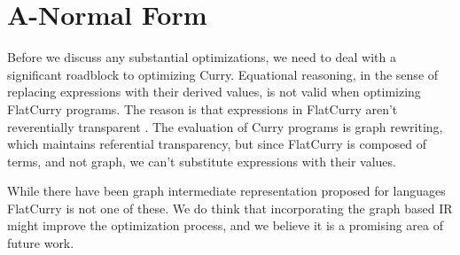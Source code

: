 \documentclass{book}
\theoremstyle{definition}
\begin{document}
\section{A-Normal Form}

Before we discuss any substantial optimizations, we need to deal with a significant
roadblock to optimizing Curry.
Equational reasoning,
in the sense of replacing expressions with their derived values,
is not valid when optimizing FlatCurry programs.
The reason is that expressions in FlatCurry aren't reverentially transparent \cite{whyFPmatters}.
The evaluation of Curry programs is graph rewriting,
which maintains referential transparency,
but since FlatCurry is composed of terms, and not graph,
we can't substitute expressions with their values.

While there have been graph intermediate representation proposed for
languages \cite{graph_ir, dactl} FlatCurry is not one of these.
We do think that incorporating the graph based IR
might improve the optimization process, and we believe
it is a promising area of future work.
\end{document}
